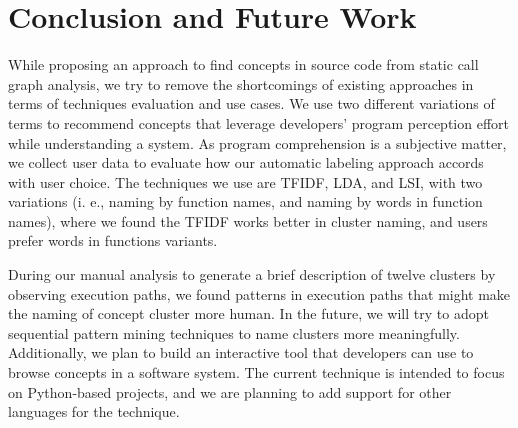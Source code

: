 \section{Conclusion and Future Work}
\label{conclusion}
While proposing an approach to find concepts in source code from static call graph analysis, we try to remove the shortcomings of existing approaches in terms of techniques evaluation and use cases. We use two different variations of terms to recommend concepts that leverage developers' program perception effort while understanding a system. As program comprehension is a subjective matter, we collect user data to evaluate how our automatic labeling approach accords with user choice. The techniques we use are TFIDF, LDA, and LSI, with two variations (i. e., naming by function names, and naming by words in function names), where we found the TFIDF works better in cluster naming, and users prefer words in functions variants.   

During our manual analysis to generate a brief description of twelve clusters by observing execution paths, we found patterns in execution paths that might make the naming of concept cluster more human. In the future, we will try to adopt sequential pattern mining techniques to name clusters more meaningfully. Additionally, we plan to build an interactive tool that developers can use to browse concepts in a software system. The current technique is intended to focus on Python-based projects, and we are planning to add support for other languages for the technique.

